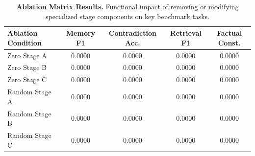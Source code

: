 \begin{table}[htbp]
\centering
\caption{\textbf{Ablation Matrix Results.} Functional impact of removing or modifying specialized stage components on key benchmark tasks.}
\label{tab:ablation_matrix}
\begin{tabular}{l c c c c}
\toprule
\textbf{Ablation Condition} & \textbf{Memory F1} & \textbf{Contradiction Acc.} & \textbf{Retrieval F1} & \textbf{Factual Const.} \\
\midrule
Zero Stage A                   & 0.0000 & 0.0000 & 0.0000 & 0.0000 \\
Zero Stage B                   & 0.0000 & 0.0000 & 0.0000 & 0.0000 \\
Zero Stage C                   & 0.0000 & 0.0000 & 0.0000 & 0.0000 \\
Random Stage A                 & 0.0000 & 0.0000 & 0.0000 & 0.0000 \\
Random Stage B                 & 0.0000 & 0.0000 & 0.0000 & 0.0000 \\
Random Stage C                 & 0.0000 & 0.0000 & 0.0000 & 0.0000 \\
\bottomrule
\end{tabular}
\end{table}
